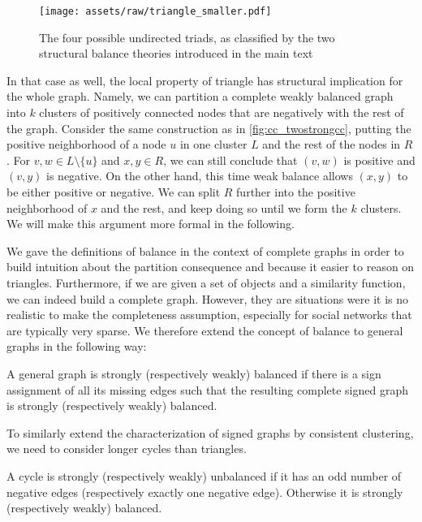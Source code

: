\begin{figure}[htpb]
	\centering
	\texttt{[image: assets/raw/triangle\_smaller.pdf]}
	\caption{The four possible undirected triads, as classified by the two structural balance theories
	introduced in the main text} \label{fig:cc_balance}
\end{figure}

In that case as well, the local property of triangle has structural implication for the whole graph.
Namely, we can partition a complete weakly balanced graph into $k$ clusters of positively connected
nodes that are negatively with the rest of the graph. Consider the same construction as in
\autoref{fig:cc_twostrongcc}, putting the positive neighborhood of a node $u$ in one cluster $L$ and
the rest of the nodes in $R$. For $v,w\in L\setminus \{u\}$ and $x,y\in R$, we can still conclude
that $(v,w)$ is positive and $(v,y)$ is negative. On the other hand, this time weak balance allows
$(x,y)$ to be either positive or negative. We can split $R$ further into the positive neighborhood of
$x$ and the rest, and keep doing so until we form the $k$ clusters. We will make this argument more
formal in the following.

We gave the definitions of balance in the context of complete graphs in order to build intuition
about the partition consequence and because it easier to reason on triangles. Furthermore, if we are
given a set of objects and a similarity function, we can indeed build a complete graph. However,
they are situations were it is no realistic to make the completeness assumption, especially for
social networks that are typically very sparse. We therefore extend the concept of balance to
general graphs in the following way:
\begin{definition}
	A general graph is strongly (respectively weakly) balanced if there is a sign assignment of all its
	missing edges such that the resulting complete signed graph is strongly (respectively weakly)
	balanced.
\end{definition}
To similarly extend the characterization of signed graphs by consistent clustering, we need to
consider longer cycles than triangles.
\begin{definition}
	A cycle is strongly (respectively weakly) unbalanced if it has an odd number of negative edges
	(respectively exactly one negative edge). Otherwise it is strongly (respectively weakly) balanced.
\end{definition}

